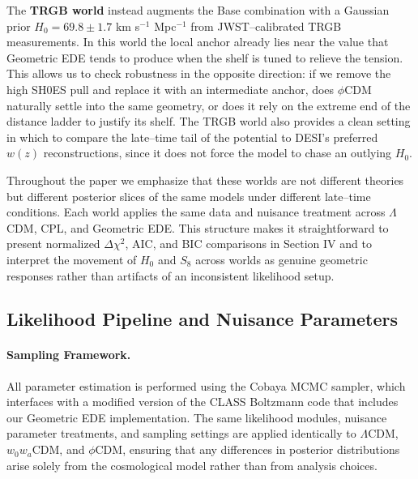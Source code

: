 \documentclass[a4paper,11pt]{article}
\begin{document}
The \textbf{TRGB world} instead augments the Base combination with a Gaussian prior $H_0 = 69.8 \pm 1.7$ km s$^{-1}$ Mpc$^{-1}$ from JWST--calibrated TRGB measurements. In this world the local anchor already lies near the value that Geometric EDE tends to produce when the shelf is tuned to relieve the tension. This allows us to check robustness in the opposite direction: if we remove the high SH0ES pull and replace it with an intermediate anchor, does $\phi$CDM naturally settle into the same geometry, or does it rely on the extreme end of the distance ladder to justify its shelf. The TRGB world also provides a clean setting in which to compare the late--time tail of the potential to DESI's preferred $w(z)$ reconstructions, since it does not force the model to chase an outlying $H_0$.

Throughout the paper we emphasize that these worlds are not different theories but different posterior slices of the same models under different late--time conditions. Each world applies the same data and nuisance treatment across $\Lambda$CDM, CPL, and Geometric EDE. This structure makes it straightforward to present normalized $\Delta\chi^2$, AIC, and BIC comparisons in Section IV and to interpret the movement of $H_0$ and $S_8$ across worlds as genuine geometric responses rather than artifacts of an inconsistent likelihood setup.


\subsection{Likelihood Pipeline and Nuisance Parameters}
\label{sec:pipeline}

\paragraph{Sampling Framework.}
All parameter estimation is performed using the Cobaya MCMC sampler, which interfaces with a modified version of the CLASS Boltzmann code that includes our Geometric EDE implementation. The same likelihood modules, nuisance parameter treatments, and sampling settings are applied identically to $\Lambda$CDM, $w_0 w_a$CDM, and $\phi$CDM, ensuring that any differences in posterior distributions arise solely from the cosmological model rather than from analysis choices.
\end{document}

